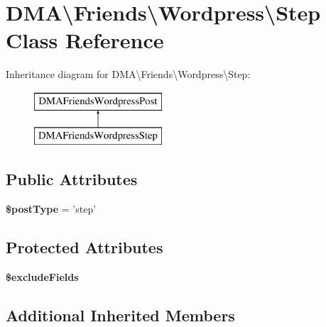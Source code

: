 \hypertarget{classDMA_1_1Friends_1_1Wordpress_1_1Step}{\section{D\-M\-A\textbackslash{}Friends\textbackslash{}Wordpress\textbackslash{}Step Class Reference}
\label{classDMA_1_1Friends_1_1Wordpress_1_1Step}
}
Inheritance diagram for D\-M\-A\textbackslash{}Friends\textbackslash{}Wordpress\textbackslash{}Step\-:\begin{figure}[H]
\begin{center}
\leavevmode
\includegraphics[height=2.000000cm]{d0/d87/classDMA_1_1Friends_1_1Wordpress_1_1Step}
\end{center}
\end{figure}
\subsection*{Public Attributes}
\begin{DoxyCompactItemize}
\item 
\hypertarget{classDMA_1_1Friends_1_1Wordpress_1_1Step_abaa142e178d837a810e5048af7f36497}{{\bfseries \$post\-Type} = 'step'}\label{classDMA_1_1Friends_1_1Wordpress_1_1Step_abaa142e178d837a810e5048af7f36497}

\end{DoxyCompactItemize}
\subsection*{Protected Attributes}
\begin{DoxyCompactItemize}
\item 
{\bfseries \$exclude\-Fields}
\end{DoxyCompactItemize}
\subsection*{Additional Inherited Members}


